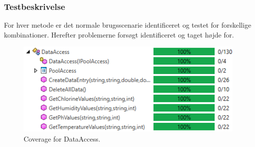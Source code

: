 \subsubsection{Testbeskrivelse}
For hver metode er det normale brugsscenarie identificeret og testet for forskellige kombinationer. Herefter problemerne forsøgt identificeret og taget højde for.

\begin{figure}[h]
	\centering
	\includegraphics[width=0.7\linewidth]{figs/test/dataaccesscoverage}
	\caption{Coverage for DataAccess.}
	\label{fig:dataaccesscoverage}
\end{figure}